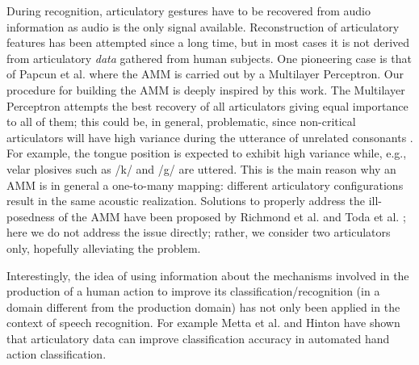 During recognition, articulatory gestures have to be recovered 
from audio information as audio is the only signal available.
Reconstruction of articulatory features has been attempted since a long
time, but in most cases it is not derived from articulatory \emph{data}
gathered from human subjects. One pioneering case is that of Papcun
et al. \cite{papcun} where the AMM is carried out by a Multilayer Perceptron.
Our procedure for building the AMM is deeply inspired by this work.
The Multilayer Perceptron attempts the best recovery of all articulators giving equal importance
to all of them; this could be, in general, problematic, since non-critical articulators will have
high variance during the utterance of unrelated consonants \cite{papcun,rose}.
For example, the tongue position is expected to exhibit high variance while, e.g., velar plosives
such as /k/ and /g/ are uttered. This is the main reason why an AMM is in general a one-to-many mapping: different articulatory configurations result in the same acoustic realization. Solutions to properly address the ill-posedness
of the AMM have been proposed by Richmond et al. \cite{richmond} and Toda et al. \cite{toda}; here we do
not address the issue directly; rather, we consider two articulators only, hopefully alleviating the problem.


Interestingly, the idea of using information about the mechanisms involved in the production of a human action to improve its classification/recognition (in a domain different from the production domain) has not only been applied in the context of speech recognition. For example Metta et al. \cite{metta-06} and Hinton \cite{hinton-2006} 
have shown that articulatory data can improve classification accuracy in automated hand action classification.

